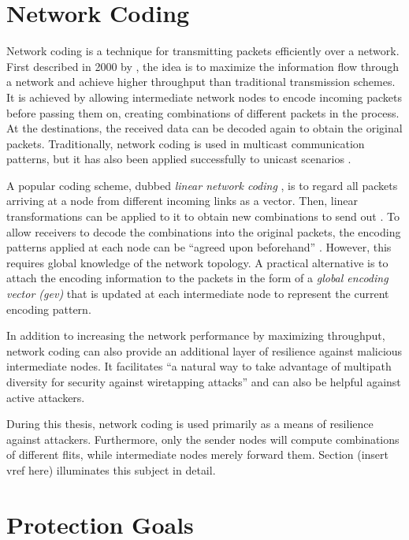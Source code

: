 \section{Network Coding}\label{sec:networkcodingfun}
Network coding is a technique for transmitting packets efficiently over a network. First described in 2000 by \citeauthor{ahlswede00networkflow}
\cite{ahlswede00networkflow}, the idea is to maximize the information flow through a network and achieve higher throughput than traditional transmission
schemes. It is achieved by allowing intermediate network nodes to encode incoming packets before passing them on, creating combinations of different
packets in the process. At the destinations, the received data can be decoded again to obtain the original packets. Traditionally, network coding is
used in multicast communication patterns, but it has also been applied successfully to unicast scenarios \cite[e.g.][]{moriam15manycorenc}.

A popular coding scheme, dubbed \textit{linear network coding} \cite{li03linearnc}, is to regard all packets arriving at a node from different incoming links as a vector.
Then, linear transformations can be applied to it to obtain new combinations to send out \cite[1]{li03linearnc}. To allow receivers to decode the
combinations into the original packets, the encoding patterns applied at each node can be \enquote{agreed upon beforehand} \cite[1]{li03linearnc}.
However, this requires global knowledge of the network topology. A practical alternative is to attach the encoding information to the packets in the
form of a \textit{global encoding vector (\gls{gev})} \cites[2\psqq]{chou03practicalnc}[5\psq]{chou07ncforinternetandwireless} that is updated at each intermediate node to
represent the current encoding pattern.

In addition to increasing the network performance by maximizing throughput, network coding can also provide an additional layer of resilience against
malicious intermediate nodes. It facilitates \enquote{a natural way to take advantage of multipath diversity for security against wiretapping attacks}
\cite[8]{fragouli07ncfundamentals} and can also be helpful against active attackers.

During this thesis, network coding is used primarily as a means of resilience against attackers. Furthermore, only the sender nodes will compute
combinations of different flits, while intermediate nodes merely forward them. Section (insert vref here) illuminates this subject in detail.

\section{Protection Goals}\label{sec:protectiongoals}
